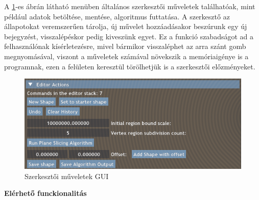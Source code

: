 A \ref{fig:editor_actions-1}-es ábrán látható menüben általános szerkesztői műveletek találhatóak, mint például adatok betöltése, mentése, algoritmus futtatása. A szerkesztő az állapotokat veremszerűen tárolja, új művelet hozzáadásakor beszúrunk egy új bejegyzést, visszalépéskor pedig kiveszünk egyet. Ez a funkció szabadságot ad a felhasználónak kísérletezésre, mivel bármikor visszaléphet az arra szánt gomb megnyomásával, viszont a műveletek számával növekszik a memóriaigénye is a programnak, ezen a felületen keresztül törölhetjük is a szerkesztői előzményeket.

\begin{figure}[H]
    \centering
    \includegraphics[width=0.85\linewidth]{images/editor_actions.png}
    \caption{Szerkesztői műveletek GUI}
    \label{fig:editor_actions-1}
\end{figure}

\textbf{Elérhető funckionalitás}

